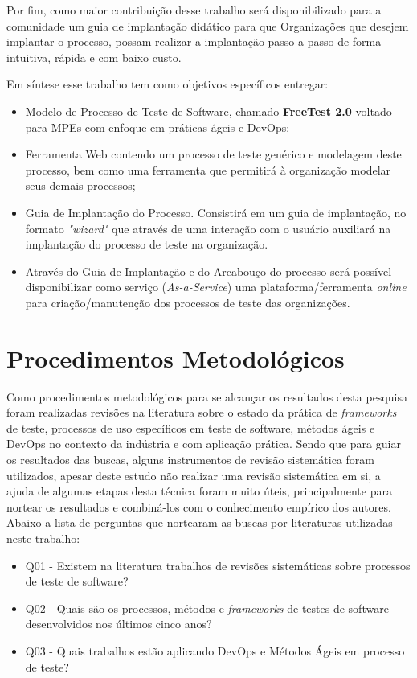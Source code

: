 Por fim, como maior contribuição desse trabalho será disponibilizado para a comunidade um guia de implantação didático para que Organizações que desejem implantar o processo, possam realizar a implantação passo-a-passo de forma intuitiva, rápida e com baixo custo. 

Em síntese esse trabalho tem como objetivos específicos entregar:

\begin{itemize}
    \item Modelo de Processo de Teste de Software, chamado \textbf{FreeTest 2.0} voltado para MPEs com enfoque em práticas ágeis e DevOps;
    \item Ferramenta Web contendo um processo de teste genérico e modelagem deste processo, bem como uma ferramenta que permitirá à organização modelar seus demais processos;
    \item Guia de Implantação do Processo. Consistirá em um guia de implantação, no formato \textit{"\textit{wizard}"} que através de uma interação com o usuário auxiliará na implantação do processo de teste na organização. 
    \item Através do Guia de Implantação e do Arcabouço do processo será possível disponibilizar como serviço (\textit{As-a-Service}) uma plataforma/ferramenta \textit{online} para criação/manutenção dos processos de teste das organizações.
\end{itemize}

\section{Procedimentos Metodológicos}
\label{sec:procedimentos}

Como procedimentos metodológicos para se alcançar os resultados desta pesquisa foram realizadas revisões na literatura sobre o estado da prática de \textit{frameworks} de teste, processos de uso específicos em teste de software, métodos ágeis e DevOps no contexto da indústria e com aplicação prática. Sendo que para guiar os resultados das buscas, alguns instrumentos de revisão sistemática foram utilizados, apesar deste estudo não realizar uma revisão sistemática em si, a ajuda de algumas etapas desta técnica foram muito úteis, principalmente para nortear os resultados e combiná-los com o conhecimento empírico dos autores. Abaixo a lista de perguntas que nortearam as buscas por literaturas utilizadas neste trabalho:

\begin{itemize}
    \item Q01 - Existem na literatura trabalhos de revisões sistemáticas sobre processos de teste de software?
    \item Q02 - Quais são os processos, métodos e \textit{frameworks} de testes de software desenvolvidos nos últimos cinco anos?
    \item Q03 - Quais trabalhos estão aplicando DevOps e Métodos Ágeis em processo de teste?
\end{itemize}

